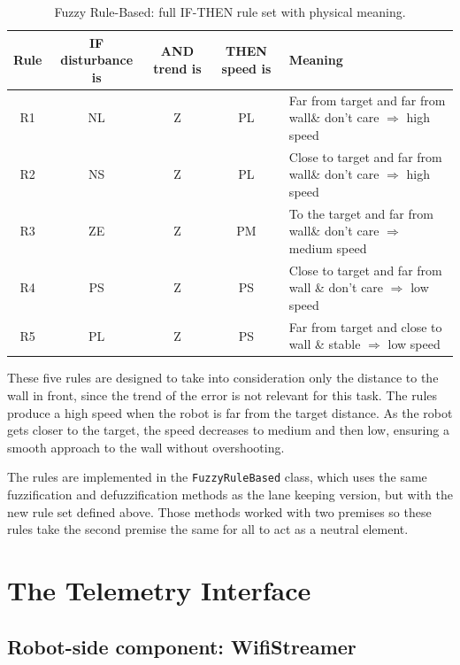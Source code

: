 \begin{table}[htbp]
\centering
\caption{Fuzzy Rule-Based: full IF-THEN rule set with physical meaning.}
\label{tab:rules-full}
\begin{tabularx}{\textwidth}{c|c|c|c|X}
\hline
\textbf{Rule} & \textbf{IF disturbance is} & \textbf{AND trend is} & \textbf{THEN speed is} & \textbf{Meaning} \\
\hline
R1  & NL & Z & PL & Far from target and far from wall\& don't care $\Rightarrow$ high speed \\
R2  & NS & Z & PL & Close to target and far from wall\& don't care $\Rightarrow$ high speed\\
R3  & ZE & Z & PM & To the target and far from wall\& don't care $\Rightarrow$ medium speed \\
R4  & PS & Z & PS & Close to target and far from wall \& don't care $\Rightarrow$ low speed \\
R5  & PL & Z & PS & Far from target and close to wall \& stable $\Rightarrow$ low speed \\
\hline
\end{tabularx}
\end{table}

These five rules are designed to take into consideration only the distance to the wall in front, since the trend of the error is not relevant for this task. The rules produce a high speed when the robot is far from the target distance. As the robot gets closer to the target, the speed decreases to medium and then low, ensuring a smooth approach to the wall without overshooting. 

The rules are implemented in the \texttt{FuzzyRuleBased} class, which uses the same fuzzification and defuzzification methods as the lane keeping version, but with the new rule set defined above. Those methods worked with two premises so these rules take the second premise the same for all to act as a neutral element. 
\section{The Telemetry Interface}
\label{sec:ui}

\subsection{Robot-side component: WifiStreamer}
\label{sec:wifi-streamer}

